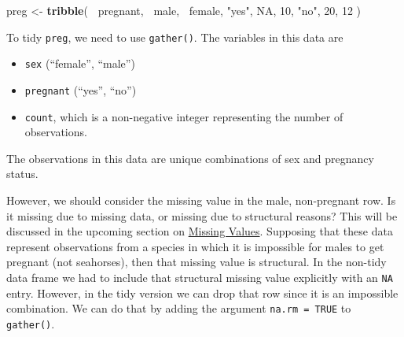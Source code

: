 \documentclass[]{book}
\newenvironment{Shaded}{\begin{snugshade}}{\end{snugshade}}
\newcommand{\CommentTok}[1]{\textcolor[rgb]{0.56,0.35,0.01}{\textit{#1}}}
\newcommand{\DataTypeTok}[1]{\textcolor[rgb]{0.13,0.29,0.53}{#1}}
\newcommand{\DecValTok}[1]{\textcolor[rgb]{0.00,0.00,0.81}{#1}}
\newcommand{\KeywordTok}[1]{\textcolor[rgb]{0.13,0.29,0.53}{\textbf{#1}}}
\newcommand{\NormalTok}[1]{#1}
\newcommand{\OperatorTok}[1]{\textcolor[rgb]{0.81,0.36,0.00}{\textbf{#1}}}
\newcommand{\OtherTok}[1]{\textcolor[rgb]{0.56,0.35,0.01}{#1}}
\newcommand{\StringTok}[1]{\textcolor[rgb]{0.31,0.60,0.02}{#1}}
\providecommand{\tightlist}{%
  \setlength{\itemsep}{0pt}\setlength{\parskip}{0pt}}
\theoremstyle{plain}
\theoremstyle{remark}
\begin{document}
\begin{Shaded}
\begin{Highlighting}[]
\NormalTok{preg <-}\StringTok{ }\KeywordTok{tribble}\NormalTok{(}
  \OperatorTok{~}\NormalTok{pregnant, }\OperatorTok{~}\NormalTok{male, }\OperatorTok{~}\NormalTok{female,}
  \StringTok{"yes"}\NormalTok{,     }\OtherTok{NA}\NormalTok{,    }\DecValTok{10}\NormalTok{,}
  \StringTok{"no"}\NormalTok{,      }\DecValTok{20}\NormalTok{,    }\DecValTok{12}
\NormalTok{)}
\end{Highlighting}
\end{Shaded}

To tidy \texttt{preg}, we need to use \texttt{gather()}. The variables
in this data are

\begin{itemize}
\tightlist
\item
  \texttt{sex} (``female'', ``male'')
\item
  \texttt{pregnant} (``yes'', ``no'')
\item
  \texttt{count}, which is a non-negative integer representing the
  number of observations.
\end{itemize}

The observations in this data are unique combinations of sex and
pregnancy status.

\begin{Shaded}
\end{Shaded}

However, we should consider the missing value in the male, non-pregnant
row. Is it missing due to missing data, or missing due to structural
reasons? This will be discussed in the upcoming section on
\href{http://r4ds.had.co.nz/tidy-data.html\#missing-values-3}{Missing
Values}. Supposing that these data represent observations from a species
in which it is impossible for males to get pregnant (not seahorses),
then that missing value is structural. In the non-tidy data frame we had
to include that structural missing value explicitly with an \texttt{NA}
entry. However, in the tidy version we can drop that row since it is an
impossible combination. We can do that by adding the argument
\texttt{na.rm\ =\ TRUE} to \texttt{gather()}.
\end{document}
